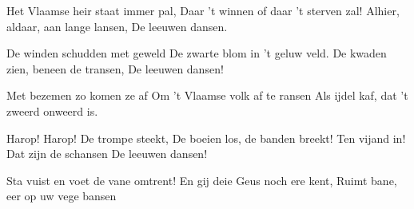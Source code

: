 \footnotemark [
ititle={Groeninghe}]


\beginverse
Het Vlaamse heir staat immer pal,
Daar 't winnen of daar 't sterven zal!
Alhier, aldaar, aan lange lansen,
De leeuwen dansen.
\endverse

\beginverse
De winden schudden met geweld
De zwarte blom in 't geluw veld.
De kwaden zien, beneen de transen,
De leeuwen dansen!
\endverse

\beginverse
Met bezemen zo komen ze af
Om 't Vlaamse volk af te ransen
Als ijdel kaf, dat 't zweerd onweerd is.
\endverse

\beginverse
Harop! Harop! De trompe steekt,
De boeien los, de banden breekt!
Ten vijand in! Dat zijn de schansen
De leeuwen dansen!
\endverse

\beginverse
Sta vuist en voet de vane omtrent!
En gij deie Geus noch ere kent,
Ruimt bane, eer op uw vege bansen
\endverse
\endsong
